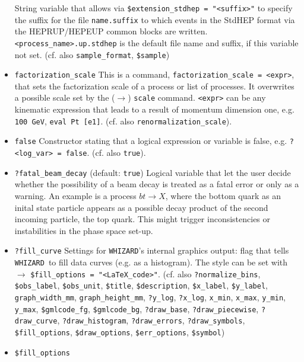 \documentclass[12pt]{book}
\newcommand{\ttt}[1]{\texttt{#1}}
\newcommand{\whizard}{\texttt{WHIZARD}}
\begin{document}
\begin{itemize}
String variable that allows via \ttt{\$extension\_stdhep = "<suffix>"} to 
specify the suffix for the file \ttt{name.suffix} to which events in
the StdHEP format via the HEPRUP/HEPEUP common blocks are
written. \ttt{<process\_name>.up.stdhep} is the default file name and
suffix, if this variable not set. (cf. also \ttt{sample\_format},
\ttt{\$sample})
\item
\ttt{factorization\_scale} \newline
This is a command, \ttt{factorization\_scale = <expr>}, that sets
the factorization scale of a process or list of processes. It
overwrites a possible scale set by the ($\to$) \ttt{scale} command. 
\ttt{<expr>} can be any kinematic expression that leads to a result of
momentum dimension one, e.g. \ttt{100 GeV}, \ttt{eval
Pt [e1]}. (cf. also \ttt{renormalization\_scale}). 
\item
\ttt{false} \newline
Constructor stating that a logical expression or variable is false,
e.g. \ttt{?<log\_var> = false}. (cf. also \ttt{true}).
\item
\ttt{?fatal\_beam\_decay} \qquad (default: \ttt{true}) \newline
Logical variable that let the user decide whether the possibility of a
beam decay is treated as a fatal error or only as a warning. An
example is a process $b t \to X$, where the bottom quark as an inital
state particle appears as a possible decay product of the second
incoming particle, the top quark. This might trigger inconsistencies
or instabilities in the phase space set-up.
\item
\ttt{?fill\_curve} \newline
Settings for \whizard's internal graphics output: flag that tells
\whizard\ to fill data curves (e.g. as a histogram). The style can be
set with $\to$ \ttt{\$fill\_options = "<LaTeX\_code>"}. (cf. also
\ttt{?normalize\_bins}, \ttt{\$obs\_label}, \ttt{\$obs\_unit}, 
\ttt{\$title}, \ttt{\$description}, \ttt{\$x\_label},
\ttt{\$y\_label}, \ttt{graph\_width\_mm}, \ttt{graph\_height\_mm},
\ttt{?y\_log}, \ttt{?x\_log}, \ttt{x\_min}, \ttt{x\_max}, 
\ttt{y\_min}, \ttt{y\_max}, \newline \ttt{\$gmlcode\_fg}, \ttt{\$gmlcode\_bg},
\ttt{?draw\_base}, \ttt{?draw\_piecewise},
\ttt{?draw\_curve}, \ttt{?draw\_histogram}, \ttt{?draw\_errors},
\ttt{?draw\_symbols}, \ttt{\$fill\_options}, \ttt{\$draw\_options},
\ttt{\$err\_options}, \ttt{\$symbol})
\item
\ttt{\$fill\_options} \newline

\end{itemize}
\end{document}
